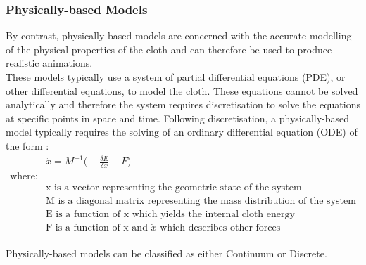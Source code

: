 \subsubsection{Physically-based Models}
By contrast, physically-based models are concerned with the accurate modelling of the physical properties of the cloth and can therefore be used to produce realistic animations.
\\These models typically use a system of partial differential equations (PDE), or other differential equations, to model the cloth. These equations cannot be solved analytically and therefore the system requires discretisation to solve the equations at specific points in space and time. Following discretisation, a physically-based model typically requires the solving of an ordinary differential equation (ODE) of the form \parencite[1]{Baraff1998}:
\begin{equation}
\begin{split}
\label{eq:general ODE}
  &\ddot{x} = M^{-1}\bigg(-\frac{\delta E}{\delta x} + F\bigg)
  \\\text{where:}
  \\&\text{x is a vector representing the geometric state of the system}
  \\&\text{M is a diagonal matrix representing the mass distribution of the system}
  \\&\text{E is a function of x which yields the internal cloth energy}
  \\&\text{F is a function of x and }\dot{x}\text{ which describes other forces}
  \end{split}
\end{equation}
\\Physically-based models can be classified as either Continuum or Discrete.

